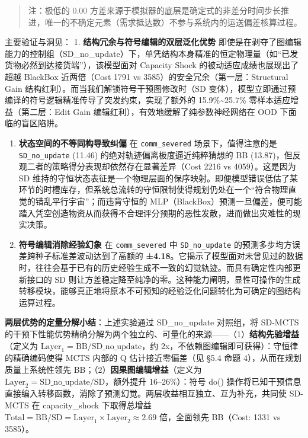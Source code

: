 \documentclass[UTF8]{ctexart}
\begin{document}
\begin{quote}
注：极低的 0.00
方差来源于模拟器的底层是确定式的非差分时间步长推进，唯一的不确定元素（需求抵达数）不参与系统内的运送偏差核算过程。
\end{quote}

主要验证与洞见： 1. \textbf{结构冗余与符号编辑的双层泛化优势}
即使是在剥夺了图编辑能力的控制组（SD\_no\_update）下，单凭结构本身精准的恒定物理量（如``已发货物必然到达接货端''），该模型面对
Capacity Shock 的被动适应成绩也展现出了超越 BlackBox 近两倍（Cost 1791
vs 3585）的安全冗余（第一层：Structural Gain
结构红利）。而当我们解锁符号干预图修改时（SD
变体），模型立即通过预编译的符号逻辑精准传导了突发约束，实现了额外的
15.9\%\textasciitilde{}25.7\% 零样本适应增益（第二层：Edit Gain
编辑红利），有效地缓解了纯参数神经网络在 OOD 下面临的盲区陷阱。

\begin{enumerate}
\def\labelenumi{\arabic{enumi}.}
\setcounter{enumi}{1}
\item
  \textbf{状态空间的不等同构导致纠偏} 在 \texttt{comm\_severed}
  场景下，值得注意的是 \texttt{SD\_no\_update} (11.46)
  的绝对轨迹偏离极度逼近纯粹猜想的 BB
  (13.87)，但反观二者的策略得分表现却依然存在显著差异（Cost 2216 vs
  4059）。这是因为 SD
  维持的守恒状态表征是一个物理层面的保序映射。即便模型错误低估了某环节的时槽库存，但系统总流转的守恒限制使得规划仍处在一个``符合物理直觉的错乱平行宇宙''；而违背守恒的
  MLP（BlackBox）预测一旦偏差，便可能踏入凭空创造物资从而获得不合理评分预期的恶性发散，进而做出灾难性的现实决策。
\item
  \textbf{符号编辑消除经验幻象} 在 \texttt{comm\_severed} 中
  \texttt{SD\_no\_update} 的预测多步均方误差跨种子标准差波动达到了高额的
  \textbf{±4.18}。它揭示了模型面对未曾见过的数据时，往往会基于已有的历史经验生成不一致的幻觉轨迹。而具有确定性内部更新接口的
  SD
  则让方差稳定降至纯净的零。这种能力阐明，显性可操作的生成转移模块，能够真正地将原本不可预知的经验泛化问题转化为可确定的图结构运算过程。
\end{enumerate}

\textbf{两层优势的定量分解小结}：上述实验通过 SD\_no\_update 对照组，将
SD-MCTS
的干预下性能优势精确分解为两个独立的、可量化的来源------（1）\textbf{结构先验增益}（定义为
\(\text{Layer}_1 = \text{BB} / \text{SD\_no\_update}\)，约
2x，不依赖图编辑即可获得）：守恒律的精确编码使得 MCTS 内部的 Q
估计接近零偏差（见 §5.4 命题 4），从而在规划质量上系统性领先
BB；（2）\textbf{因果图编辑增益}（定义为
\(\text{Layer}_2 = \text{SD\_no\_update} / \text{SD}\)，额外提升
16--26\%）：符号 do()
操作将已知干预信息直接编入转移函数，消除了预测幻觉。两层收益相互独立、互为补充，共同使
SD-MCTS 在 capacity\_shock 下取得总增益
\(\text{Total} = \text{BB} / \text{SD} = \text{Layer}_1 \times \text{Layer}_2 \approx 2.69\)
倍，全面领先 BB（Cost: 1331 vs 3585）。
\end{document}
